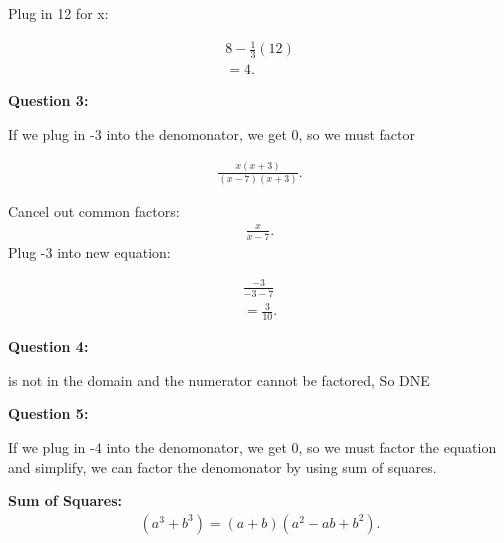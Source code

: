 \documentclass{report}
\begin{document}
    \bigbreak \noindent \bigbreak \noindent 
    \noindent Plug in 12 for x:

    \begin{align*}
        8 - \frac{1}{3} \left(12\right) \\
        =4
    .\end{align*}

    \bigbreak \noindent \bigbreak \noindent 
    \begin{Large}
       \textbf{Question 3:} 
    \end{Large}

    \bigbreak \noindent 
    \noindent If we plug in -3 into the denomonator, we get 0, so we must factor
     
    \begin{align*}
        \frac{x \left(x+3\right)}{ \left(x-7\right) \left(x+3\right)}
    .\end{align*}

    \noindent Cancel out common factors:
    \begin{align*}
        \frac{x}{x-7}
    .\end{align*}
    \noindent Plug -3 into new equation:

    \begin{align*}
       \frac{-3}{-3-7} \\
       = \frac{3}{10}
    .\end{align*}

    \bigbreak \noindent \bigbreak \noindent 
    \begin{Large}
       \textbf{Question 4:} 
    \end{Large}

    \bigbreak \noindent 
    
     is not in the domain and the numerator cannot be factored, So DNE

    \bigbreak \noindent \bigbreak \noindent 
    \begin{Large}
       \textbf{Question 5:} 
    \end{Large}

    \bigbreak \noindent 
    \noindent If we plug in -4 into the denomonator, we get 0, so we must factor the equation
    and simplify, we can factor the denomonator by using sum of squares.

    \bigbreak \noindent 
    \textbf{Sum of Squares:}
    \begin{align*}
        \left(a^3+b^3\right) = \left(a+b\right) \left(a^2-ab+b^2\right)
    .\end{align*}
\end{document}
